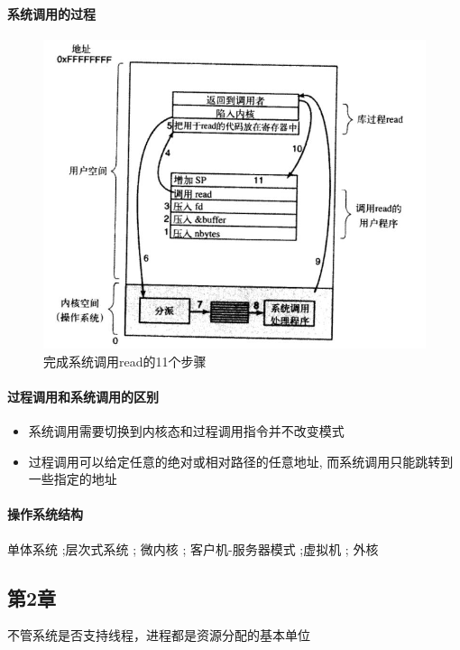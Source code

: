 \documentclass[UTF8,a4paper]{ctexart}
\begin{document}
\paragraph{系统调用的过程}
\begin{figure}[H]
	\centering
	\includegraphics[scale = 0.5]{assets/ModernOperatingSystems/2018-01-11-19-44-54.png}
	\caption{完成系统调用read的11个步骤}
\end{figure}

\paragraph{过程调用和系统调用的区别}
\begin{itemize}
	\item 系统调用需要切换到内核态和过程调用指令并不改变模式
	\item 过程调用可以给定任意的绝对或相对路径的任意地址, 而系统调用只能跳转到一些指定的地址
\end{itemize}

\paragraph{操作系统结构} 单体系统 ;层次式系统 ; 微内核 ; 客户机-服务器模式 ;虚拟机 ; 外核

\subsection{第2章}

不管系统是否支持线程，进程都是资源分配的基本单位
\end{document}
